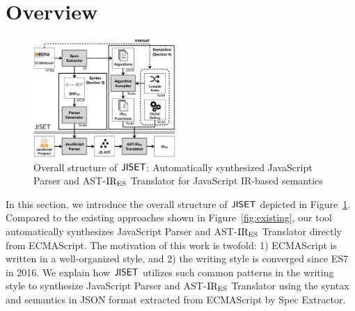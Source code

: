 \section{Overview}\label{sec:overview}
\begin{figure}
  \centering
  \includegraphics[width=0.48\textwidth]{img/overview}
  \caption{Overall structure of \( \text{\sf JISET} \): Automatically synthesized {\sf
    JavaScript Parser} and {\sf AST-\( \text{IR}_\text{ES} \) Translator} for JavaScript
    IR-based semantics}
  \label{fig:overview}
\vspace*{-1em}
\end{figure}

In this section, we introduce the overall structure of \( \text{\sf JISET} \) depicted in
Figure~\ref{fig:overview}.  Compared to the existing approaches shown in
Figure~\ref{fig:existing}, our tool automatically synthesizes {\sf JavaScript
Parser} and {\sf AST-\( \text{IR}_\text{ES} \) Translator} directly from ECMAScript. The
motivation of this work is twofold: 1) ECMAScript is written in a well-organized
style, and 2) the writing style is converged since ES7 in 2016.
We explain how \( \text{\sf JISET} \) utilizes such common patterns in the writing style to
synthesize {\sf JavaScript Parser} and {\sf AST-\( \text{IR}_\text{ES} \) Translator}
using the syntax and semantics in JSON format
extracted from ECMAScript by {\sf Spec Extractor}.


